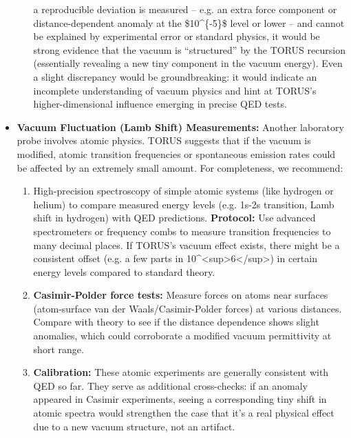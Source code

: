\begin{itemize}
\begin{enumerate}
    a reproducible deviation is measured -- e.g. an extra force
    component or distance-dependent anomaly at the \$10\^{}\{-5\}\$
    level or lower -- and cannot be explained by experimental error or
    standard physics, it would be strong evidence that the vacuum is
    ``structured'' by the TORUS recursion (essentially revealing a new
    tiny component in the vacuum energy)​. Even a slight discrepancy
    would be groundbreaking: it would indicate an incomplete
    understanding of vacuum physics and hint at TORUS's
    higher-dimensional influence emerging in precise QED tests.
  \end{enumerate}
\item
  \textbf{Vacuum Fluctuation (Lamb Shift) Measurements:} Another
  laboratory probe involves atomic physics. TORUS suggests that if the
  vacuum is modified, atomic transition frequencies or spontaneous
  emission rates could be affected by an extremely small amount​. For
  completeness, we recommend:

  \begin{enumerate}
  \def\labelenumi{\arabic{enumi}.}
  \item
    High-precision spectroscopy of simple atomic systems (like hydrogen
    or helium) to compare measured energy levels (e.g. 1s-2s transition,
    Lamb shift in hydrogen) with QED predictions. \textbf{Protocol:} Use
    advanced spectrometers or frequency combs to measure transition
    frequencies to many decimal places. If TORUS's vacuum effect exists,
    there might be a consistent offset (e.g. a few parts in
    10\^{}\textless{}sup\textgreater{}6\textless{}/sup\textgreater{}) in
    certain energy levels compared to standard theory​.
  \item
    \textbf{Casimir-Polder force tests:} Measure forces on atoms near
    surfaces (atom-surface van der Waals/Casimir-Polder forces) at
    various distances. Compare with theory to see if the distance
    dependence shows slight anomalies, which could corroborate a
    modified vacuum permittivity at short range.
  \item
    \textbf{Calibration:} These atomic experiments are generally
    consistent with QED so far. They serve as additional cross-checks:
    if an anomaly appeared in Casimir experiments, seeing a
    corresponding tiny shift in atomic spectra would strengthen the case
    that it's a real physical effect due to a new vacuum structure, not
    an artifact.
  \end{enumerate}
\end{itemize}

